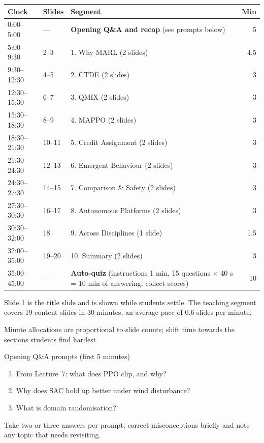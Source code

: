\documentclass[11pt]{article}
\begin{document}
\begin{center}\small\renewcommand{\arraystretch}{1.2}\begin{tabularx}{\textwidth}{@{}l l X r@{}}\toprule\textbf{Clock} & \textbf{Slides} & \textbf{Segment} & \textbf{Min}\\\midrule

0:00--5:00 & --- & \textbf{Opening Q\&A and recap} (see prompts below) & 5\\

5:00--9:30 & 2--3 & 1. Why MARL (2 slides) & 4.5\\

9:30--12:30 & 4--5 & 2. CTDE (2 slides) & 3\\

12:30--15:30 & 6--7 & 3. QMIX (2 slides) & 3\\

15:30--18:30 & 8--9 & 4. MAPPO (2 slides) & 3\\

18:30--21:30 & 10--11 & 5. Credit Assignment (2 slides) & 3\\

21:30--24:30 & 12--13 & 6. Emergent Behaviour (2 slides) & 3\\

24:30--27:30 & 14--15 & 7. Comparison \& Safety (2 slides) & 3\\

27:30--30:30 & 16--17 & 8. Autonomous Platforms (2 slides) & 3\\

30:30--32:00 & 18 & 9. Across Disciplines (1 slide) & 1.5\\

32:00--35:00 & 19--20 & 10. Summary (2 slides) & 3\\

35:00--45:00 & --- & \textbf{Auto-quiz} (instructions 1 min, 15 questions $\times$ 40 s = 10 min of answering; collect scores) & 10\\\bottomrule\end{tabularx}\end{center}

Slide 1 is the title slide and is shown while students settle. The teaching segment covers 19 content slides in 30 minutes, an average pace of 0.6 slides per minute. 

Minute allocations are proportional to slide counts; shift time towards the sections students find hardest.

\begin{instr}{Opening Q\&A prompts (first 5 minutes)}\begin{enumerate}\item From Lecture~7: what does PPO clip, and why?\item Why does SAC hold up better under wind disturbance?\item What is domain randomisation?\end{enumerate}Take two or three answers per prompt; correct misconceptions briefly and note any topic that needs revisiting.\end{instr}
\end{document}

